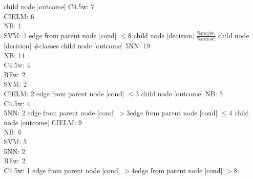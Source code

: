 child {node [outcome] {C4.5w: 7\\
CIELM: 6\\
NB: 1\\
SVM: 1} edge from parent node [cond] {$\leq 8$}}
child {node [decision] {$\frac{\%major.}{\%minor.}$}
child {node [decision] {\#classes}
child {node [outcome] {5NN: 19\\
NB: 14\\
C4.5w: 4\\
RFw: 2\\
SVM: 2\\
CIELM: 2} edge from parent node [cond] {$\leq 3$}}
child {node [outcome] {NB: 5\\
C4.5w: 4\\
5NN: 2} edge from parent node [cond] {$> 3$}}edge from parent node [cond] {$\leq 4$}}
child {node [outcome] {CIELM: 9\\
NB: 6\\
SVM: 5\\
5NN: 2\\
RFw: 2\\
C4.5w: 1} edge from parent node [cond] {$> 4$}}edge from parent node [cond] {$> 8$}};